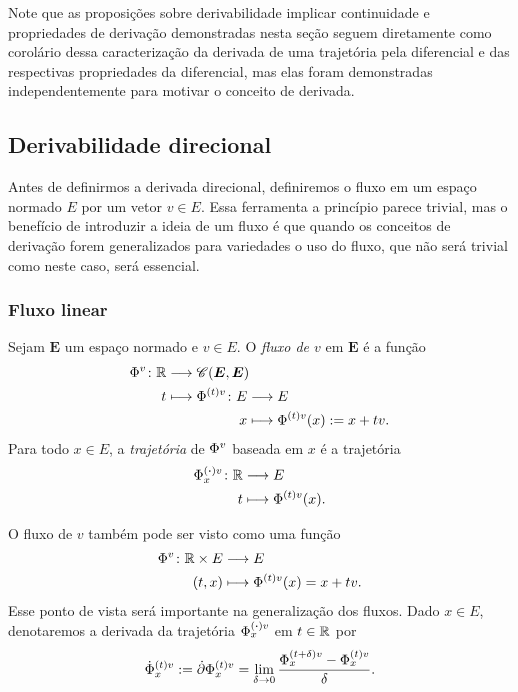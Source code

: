 Note que as proposições sobre derivabilidade implicar continuidade e propriedades de derivação demonstradas nesta seção seguem diretamente como corolário dessa caracterização da derivada de uma trajetória pela diferencial e das respectivas propriedades da diferencial, mas elas foram demonstradas independentemente para motivar o conceito de derivada.

\subsection{Derivabilidade direcional}

Antes de definirmos a derivada direcional, definiremos o fluxo em um espaço normado $E$ por um vetor $v \in E$. Essa ferramenta a princípio parece trivial, mas o benefício de introduzir a ideia de um fluxo é que quando os conceitos de derivação forem generalizados para variedades o uso do fluxo, que não será trivial como neste caso, será essencial.

\subsubsection{Fluxo linear}

\begin{definition}
Sejam $\bm E$ um espaço normado e $v \in E$. O \emph{fluxo de $v$} em $\bm E$ é a função
	\begin{align*}
	\func{\flux{}{v}}{\R}{\Cont(\bm E,\bm E)}{t}{
		\begin{aligned}[t]
		\func{\flux{(t)}{v}}{E}{E}{x}{\flux{(t)}{v}(x) := x+tv}.
		\end{aligned}
	}
	\end{align*}
Para todo $x \in E$, a \emph{trajetória} de $\flux{}{v}$ baseada em $x$ é a trajetória
	\begin{align*}
	\func{\flux{(\var)}{v}_{x}}{\R}{E}{t}{\flux{(t)}{v}(x)}.
	\end{align*}
\end{definition}

O fluxo de $v$ também pode ser visto como uma função
	\begin{align*}
	\func{\flux{}{v}}{\R \times E}{E}{(t,x)}{\flux{(t)}{v}(x) = x+tv}.
	\end{align*}
Esse ponto de vista será importante na generalização dos fluxos. Dado $x \in E$, denotaremos a derivada da trajetória $\flux{(\var)}{v}_{x}$ em $t \in \R$ por
	\begin{equation*}
	\flux[\dot]{(t)}{v}_{x} := \der \flux{(t)}{v}_{x} = \lim_{\delta \to 0} \frac{\flux{(t+\delta)}{v}_{x} - \flux{(t)}{v}_{x}}{\delta}.
	\end{equation*}

